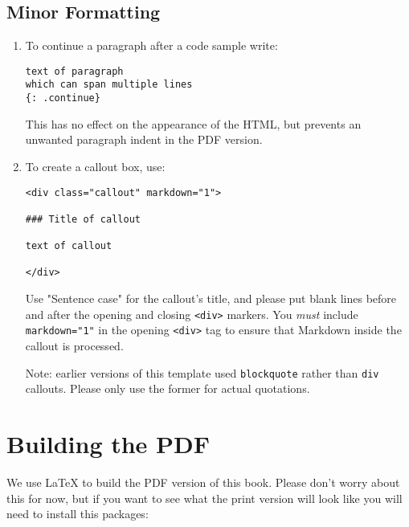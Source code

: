 \documentclass{scrbook}
\begin{document}
\subsection*{Minor Formatting}

\begin{enumerate}

\item 

To continue a paragraph after a code sample write:

\begin{lstlisting}[frame=single,frameround=tttt]
text of paragraph
which can span multiple lines
{: .continue}
\end{lstlisting}


This has no effect on the appearance of the HTML,
but prevents an unwanted paragraph indent in the PDF version.



\item 

To create a callout box, use:

\begin{lstlisting}[frame=single,frameround=tttt]
<div class="callout" markdown="1">

### Title of callout

text of callout

</div>
\end{lstlisting}


Use "Sentence case" for the callout's title,
and please put blank lines before and after the opening and closing \texttt{<div>} markers.
You \emph{must} include \texttt{markdown="1"} in the opening \texttt{<div>} tag
to ensure that Markdown inside the callout is processed.


Note: earlier versions of this template used \texttt{blockquote} rather than \texttt{div} callouts.
Please only use the former for actual quotations.



\end{enumerate}

\section*{Building the PDF}


We use LaTeX to build the PDF version of this book.
Please don't worry about this for now,
but if you want to see what the print version will look like
you will need to install this packages:
\end{document}
